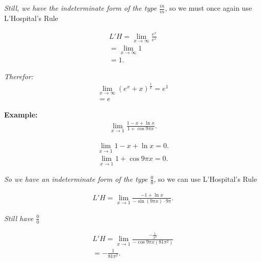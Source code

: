 \documentclass{report}
\begin{document}
  \bigbreak \noindent 
  \textit{Still, we have the indeterminate form of the type $\frac{in}{in} $}, so we
  must once again use L'Hospital's Rule

  \begin{align*}
    L'H = \lim_{x \to \infty}{\frac{e^{x}}{e^{x}}} \\
    = \lim_{x \to \infty}{1} \\ =1
  .\end{align*}

  \bigbreak \noindent
  \textit{Therefor:}
  \begin{align*}
   \lim_{x \to \infty}{(e^{x}+x)^{\frac{1}{x}}} = e^{1} \\
   = e
  \end{align*}

  \bigbreak \noindent 
  \begin{mdframed}
    \textbf{Example:}
    \begin{align*}
      \lim_{x \to 1}{\frac{1-x+\ln{x}}{1+\cos{9\pi x}}}
    .\end{align*}
  \end{mdframed}

  \begin{align*}
    \lim_{x \to 1}{1-x+\ln{x}} = 0
  .\end{align*}
  \begin{align*}
    \lim_{x \to 1}{1+\cos{9\pi x}} = 0
  .\end{align*}

  \bigbreak \noindent 
  \textit{So we have an indeterminate form of the type $\frac{0}{0} $}, so we can use L'Hospital's Rule

  \begin{align*}
    L'H = \lim_{x \to 1}{\frac{-1+\ln{x}}{-\sin{(9\pi x) \cdot 9\pi}}}
  .\end{align*}

  \bigbreak \noindent 
  \textit{Still have $\frac{0}{0}$}

  \begin{align*}
    L'H = \lim_{x \to 1}{\frac{-\frac{1}{x^{2}}}{-\cos{9\pi x}(81 \pi^{2})}} \\
    = \boxed{-\frac{1}{81\pi^{2}}}
  .\end{align*}
\end{document}
